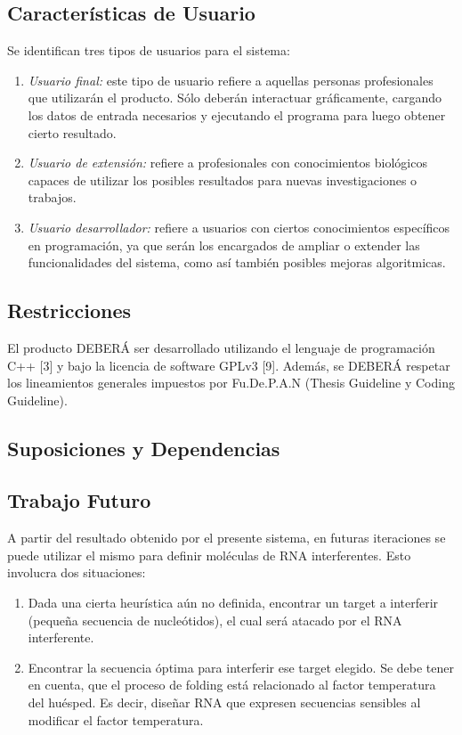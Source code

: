 \documentclass[12pt,a4paper,english,spanish]{article}
\begin{document}
\subsection{Características de Usuario}
	Se identifican tres tipos de usuarios para el sistema:
	\begin{enumerate}
 		\item \textit{Usuario final:} este tipo de usuario refiere a aquellas personas profesionales que utilizarán el 										producto. Sólo deberán interactuar gráficamente, cargando los datos de entrada 										necesarios y ejecutando el programa para luego obtener cierto resultado. 
		\item \textit{Usuario de extensión:} refiere a profesionales con conocimientos biológicos capaces de utilizar los 												posibles resultados para nuevas investigaciones o trabajos.
		\item \textit{Usuario desarrollador:} refiere a usuarios con ciertos conocimientos específicos en programación, 											ya que serán los encargados de ampliar o extender las funcionalidades del 												sistema, como así también posibles mejoras algoritmicas.
	\end{enumerate}

\subsection{Restricciones}
	El producto DEBERÁ ser desarrollado utilizando el lenguaje de programación C++ [3] y bajo la licencia de software 		GPLv3 [9]. Además, se DEBERÁ respetar los lineamientos generales impuestos por Fu.De.P.A.N (Thesis Guideline y 		   	Coding Guideline). 

\subsection{Suposiciones y Dependencias} 


\subsection{Trabajo Futuro}
A partir del resultado obtenido por el presente sistema, en futuras iteraciones se puede utilizar el mismo para definir moléculas de RNA interferentes. Esto involucra dos situaciones:
\begin{enumerate}
	\item Dada una cierta heurística aún no definida, encontrar un target a interferir (pequeña secuencia de 			 			nucleótidos), el cual será atacado por el RNA interferente.
	\item Encontrar la secuencia óptima para interferir ese target elegido. Se debe tener en cuenta, que el proceso de 			folding está relacionado al factor temperatura del huésped. Es decir, diseñar RNA que expresen secuencias 			sensibles al modificar el factor temperatura.
\end{enumerate}
\end{document}
